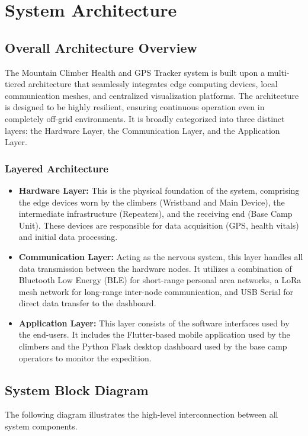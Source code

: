\chapter{System Architecture}
\label{ch:system-architecture}

\section{Overall Architecture Overview}
The Mountain Climber Health and GPS Tracker system is built upon a multi-tiered architecture that seamlessly integrates edge computing devices, local communication meshes, and centralized visualization platforms. The architecture is designed to be highly resilient, ensuring continuous operation even in completely off-grid environments. It is broadly categorized into three distinct layers: the Hardware Layer, the Communication Layer, and the Application Layer.

\subsection{Layered Architecture}
\begin{itemize}
    \item \textbf{Hardware Layer:} This is the physical foundation of the system, comprising the edge devices worn by the climbers (Wristband and Main Device), the intermediate infrastructure (Repeaters), and the receiving end (Base Camp Unit). These devices are responsible for data acquisition (GPS, health vitals) and initial data processing.
    \item \textbf{Communication Layer:} Acting as the nervous system, this layer handles all data transmission between the hardware nodes. It utilizes a combination of Bluetooth Low Energy (BLE) for short-range personal area networks, a LoRa mesh network for long-range inter-node communication, and USB Serial for direct data transfer to the dashboard.
    \item \textbf{Application Layer:} This layer consists of the software interfaces used by the end-users. It includes the Flutter-based mobile application used by the climbers and the Python Flask desktop dashboard used by the base camp operators to monitor the expedition.
\end{itemize}

\section{System Block Diagram}
The following diagram illustrates the high-level interconnection between all system components.

